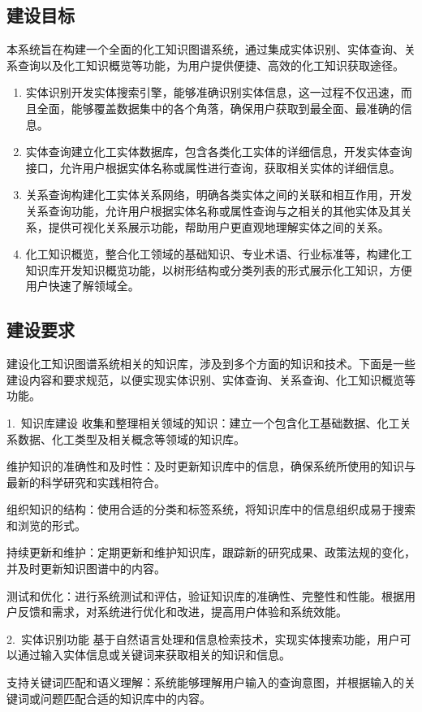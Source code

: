 \subsection{建设目标} 
本系统旨在构建一个全面的化工知识图谱系统，通过集成实体识别、实体查询、关系查询以及化工知识概览等功能，为用户提供便捷、高效的化工知识获取途径。
\begin{enumerate}
	\item 实体识别开发实体搜索引擎，能够准确识别实体信息，这一过程不仅迅速，而且全面，能够覆盖数据集中的各个角落，确保用户获取到最全面、最准确的信息。
	\item 实体查询建立化工实体数据库，包含各类化工实体的详细信息，开发实体查询接口，允许用户根据实体名称或属性进行查询，获取相关实体的详细信息。
	\item 关系查询构建化工实体关系网络，明确各类实体之间的关联和相互作用，开发关系查询功能，允许用户根据实体名称或属性查询与之相关的其他实体及其关系，提供可视化关系展示功能，帮助用户更直观地理解实体之间的关系。
	\item 化工知识概览，整合化工领域的基础知识、专业术语、行业标准等，构建化工知识库开发知识概览功能，以树形结构或分类列表的形式展示化工知识，方便用户快速了解领域全。
\end{enumerate}

\subsection{建设要求} 
建设化工知识图谱系统相关的知识库，涉及到多个方面的知识和技术。下面是一些建设内容和要求规范，以便实现实体识别、实体查询、关系查询、化工知识概览等功能。 

1.~{知识库建设} 
  收集和整理相关领域的知识：建立一个包含化工基础数据、化工关系数据、化工类型及相关概念等领域的知识库。

维护知识的准确性和及时性：及时更新知识库中的信息，确保系统所使用的知识与最新的科学研究和实践相符合。

组织知识的结构：使用合适的分类和标签系统，将知识库中的信息组织成易于搜索和浏览的形式。

持续更新和维护：定期更新和维护知识库，跟踪新的研究成果、政策法规的变化，并及时更新知识图谱中的内容。

测试和优化：进行系统测试和评估，验证知识库的准确性、完整性和性能。根据用户反馈和需求，对系统进行优化和改进，提高用户体验和系统效能。

2.~{实体识别功能} 
基于自然语言处理和信息检索技术，实现实体搜索功能，用户可以通过输入实体信息或关键词来获取相关的知识和信息。

支持关键词匹配和语义理解：系统能够理解用户输入的查询意图，并根据输入的关键词或问题匹配合适的知识库中的内容。


